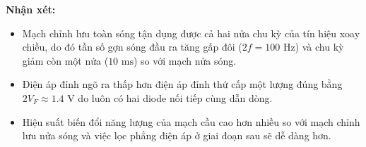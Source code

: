 \noindent\textbf{Nhận xét:}
\begin{itemize}[leftmargin=1.5em]
  \item Mạch chỉnh lưu toàn sóng tận dụng được cả hai nửa chu kỳ của tín hiệu xoay chiều, do đó tần số gợn sóng đầu ra tăng gấp đôi ($2f = 100\text{ Hz}$) và chu kỳ giảm còn một nửa ($10\text{ ms}$) so với mạch nửa sóng.
  \item Điện áp đỉnh ngõ ra thấp hơn điện áp đỉnh thứ cấp một lượng đúng bằng $2V_F \approx 1.4\text{ V}$ do luôn có hai diode nối tiếp cùng dẫn dòng.
  \item Hiệu suất biến đổi năng lượng của mạch cầu cao hơn nhiều so với mạch chỉnh lưu nửa sóng và việc lọc phẳng điện áp ở giai đoạn sau sẽ dễ dàng hơn.
\end{itemize}
